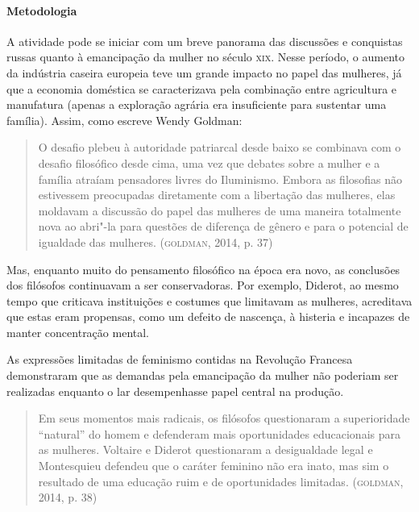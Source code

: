 \documentclass[11pt]{extarticle}
\begin{document}
\paragraph{Metodologia}
A atividade pode se iniciar com um breve panorama das discussões e
conquistas russas quanto à emancipação da mulher no século \textsc{xix}. Nesse
período, o aumento da indústria caseira europeia teve um grande impacto
no papel das mulheres, já que a economia doméstica se caracterizava pela
combinação entre agricultura e manufatura (apenas a exploração agrária
era insuficiente para sustentar uma família). Assim, como escreve Wendy
Goldman:

\begin{quote}
O desafio plebeu à autoridade patriarcal desde baixo se combinava com o
desafio filosófico desde cima, uma vez que debates sobre a mulher e a
família atraíam pensadores livres do Iluminismo. Embora as filosofias
não estivessem preocupadas diretamente com a libertação das mulheres,
elas moldavam a discussão do papel das mulheres de uma maneira
totalmente nova ao abri"-la para questões de diferença de gênero e para o
potencial de igualdade das mulheres. (\textsc{goldman}, 2014, p. 37)
\end{quote}

Mas, enquanto muito do pensamento filosófico na época era novo, as
conclusões dos filósofos continuavam a ser conservadoras. Por exemplo,
Diderot, ao mesmo tempo que criticava instituições e costumes que
limitavam as mulheres, acreditava que estas eram propensas, como um
defeito de nascença, à histeria e incapazes de manter concentração
mental.

As expressões limitadas de feminismo contidas na Revolução Francesa
demonstraram que as demandas pela emancipação da mulher não poderiam ser
realizadas enquanto o lar desempenhasse papel central na produção.

\begin{quote}
Em seus momentos mais radicais, os filósofos questionaram a
superioridade ``natural'' do homem e defenderam mais oportunidades
educacionais para as mulheres. Voltaire e Diderot questionaram a
desigualdade legal e Montesquieu defendeu que o caráter feminino não era
inato, mas sim o resultado de uma educação ruim e de oportunidades
limitadas. (\textsc{goldman}, 2014, p. 38)
\end{quote}
\end{document}
